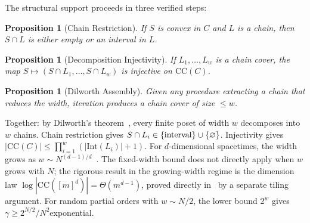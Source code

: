 \documentclass[11pt,a4paper]{article}
\theoremstyle{plain}
\newtheorem{proposition}[theorem]{Proposition}
\theoremstyle{definition}
\theoremstyle{remark}
\newcommand{\CC}{\mathrm{CC}}
\newcommand{\Int}{\mathrm{Int}}
\begin{document}
The structural support proceeds in three verified steps:

\begin{proposition}[Chain Restriction]
If $S$ is convex in $C$ and $L$ is a chain, then $S \cap L$ is either empty or an interval in $L$.
\end{proposition}

\begin{proposition}[Decomposition Injectivity]
If $L_1, \ldots, L_w$ is a chain cover, the map $S \mapsto (S \cap L_1, \ldots, S \cap L_w)$ is injective on $\CC(C)$.
\end{proposition}

\begin{proposition}[Dilworth Assembly]
Given any procedure extracting a chain that reduces the width, iteration produces a chain cover of size $\leq w$.
\end{proposition}

Together: by Dilworth's theorem~\cite{dilworth1950}, every finite poset of width $w$ decomposes into $w$ chains.
Chain restriction gives $S \cap L_i \in \{{\rm interval}\} \cup \{\varnothing\}$.
Injectivity gives $|\CC(C)| \leq \prod_{i=1}^w (|\Int(L_i)| + 1)$.
For $d$-dimensional spacetimes, the width grows as $w \sim N^{(d-1)/d}$~\cite{myrheim1978}. The fixed-width bound does not directly apply when $w$ grows with $N$; the rigorous result in the growing-width regime is the dimension law $\log|\CC([m]^d)| = \Theta(m^{d-1})$, proved directly in~\cite{difiore2026grid} by a separate tiling argument.
For random partial orders with $w \sim N/2$, the lower bound $2^w$ gives $\gamma \geq 2^{N/2}/N^2$\textemdash exponential.
\end{document}
